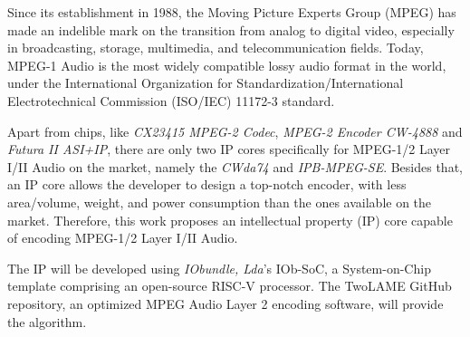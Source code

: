 

Since its establishment in 1988, the Moving Picture Experts Group (MPEG) has made an indelible mark on the transition from analog to digital video, especially in broadcasting, storage, multimedia, and telecommunication fields.
Today, MPEG-1 Audio is the most widely compatible lossy audio format in the world, under the International Organization for Standardization/International Electrotechnical Commission (ISO/IEC) 11172-3 standard.

Apart from chips, like \textit{CX23415 MPEG-2 Codec}, \textit{MPEG-2 Encoder CW-4888} and \textit{Futura II ASI+IP}, there are only two IP cores specifically for MPEG-1/2 Layer I/II Audio on the market, namely the \textit{CWda74} and \textit{IPB-MPEG-SE}.
Besides that, an IP core allows the developer to design a top-notch encoder, with less area/volume, weight, and power consumption than the ones available on the market.
Therefore, this work proposes an intellectual property (IP) core capable of encoding MPEG-1/2 Layer I/II Audio. 

The IP will be developed using \textit{IObundle, Lda}'s IOb-SoC, a System-on-Chip template comprising an open-source RISC-V processor. The TwoLAME GitHub repository, an optimized MPEG Audio Layer 2 encoding software, will provide the algorithm.
